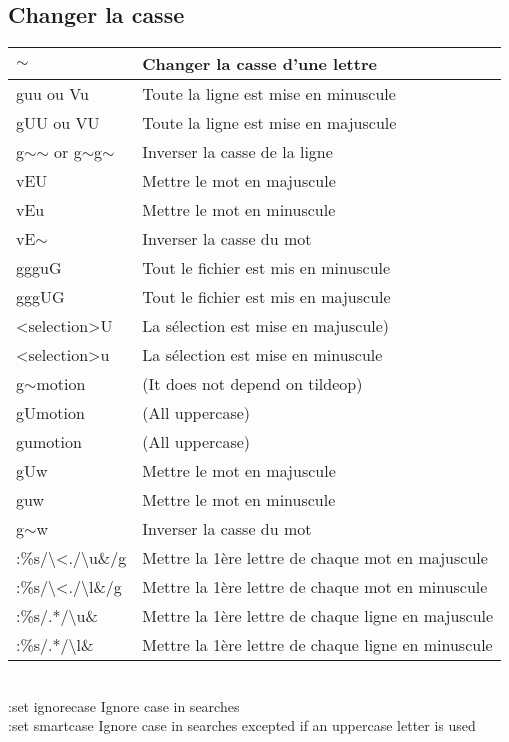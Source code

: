 \documentclass{article}
\begin{document}
\subsection{Changer la casse}
\begin{tabular}{|p{3cm}| l| }\hline
    $\sim$ & Changer la casse d'une lettre \\ \hline
guu ou Vu& Toute la ligne est mise en minuscule\\ \hline
gUU ou VU & Toute la ligne est mise en majuscule\\ \hline
g$\sim$$\sim$ or g$\sim$g$\sim$ & Inverser la casse de la ligne\\ \hline
vEU & Mettre le mot en majuscule \\ \hline
vEu & Mettre le mot en minuscule\\ \hline
vE$\sim$ & Inverser la casse du mot\\ \hline
ggguG & Tout le fichier est mis en minuscule\\ \hline
gggUG & Tout le fichier est mis en majuscule\\ \hline
<selection>U & La sélection est mise en majuscule) \\ \hline
<selection>u & La sélection est mise en minuscule \\ \hline
g$\sim$motion & (It does not depend on tildeop) \\ \hline
gUmotion & (All uppercase) \\ \hline
gumotion & (All uppercase) \\ \hline
gUw & Mettre le mot en majuscule\\ \hline
guw & Mettre le mot en minuscule \\ \hline
g$\sim$w & Inverser la casse du mot \\ \hline
    :\%s/\textbackslash{}\textless{}./\textbackslash{}u\&/g & Mettre la 1ère lettre de chaque mot en majuscule \\ \hline
    :\%s/\textbackslash{}\textless{}./\textbackslash{}l\&/g & Mettre la 1ère lettre de chaque mot en minuscule \\ \hline
    :\%s/.*/\textbackslash{}u\& &	Mettre la 1ère lettre de chaque ligne en majuscule\\ \hline
    :\%s/.*/\textbackslash{}l\& &	Mettre la 1ère lettre de chaque ligne en minuscule\\ \hline
\end{tabular}\\
:set ignorecase Ignore case in searches\\
:set smartcase Ignore case in searches excepted if an uppercase letter is used
\end{document}
